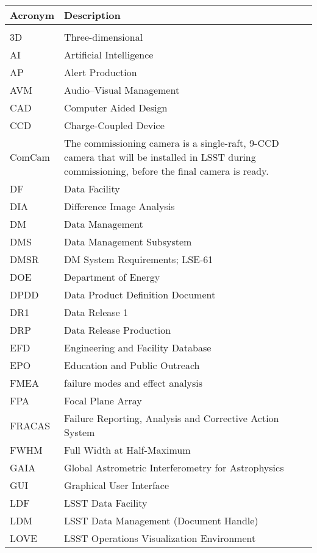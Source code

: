 \addtocounter{table}{-1}
\begin{longtable}{p{}p{}}\hline
\textbf{Acronym} & \textbf{Description}  \\\hline

 &  \\\hline
3D & Three-dimensional \\\hline
AI & Artificial Intelligence \\\hline
AP & Alert Production \\\hline
AVM & Audio--Visual Management \\\hline
CAD & Computer Aided Design \\\hline
CCD & Charge-Coupled Device \\\hline
ComCam & The commissioning camera is a single-raft, 9-CCD camera that will be installed in LSST during commissioning, before the final camera is ready. \\\hline
DF & Data Facility \\\hline
DIA & Difference Image Analysis \\\hline
DM & Data Management \\\hline
DMS & Data Management Subsystem \\\hline
DMSR & DM System Requirements; LSE-61 \\\hline
DOE & Department of Energy \\\hline
DPDD & Data Product Definition Document \\\hline
DR1 & Data Release 1 \\\hline
DRP & Data Release Production \\\hline
EFD & Engineering and Facility Database \\\hline
EPO & Education and Public Outreach \\\hline
FMEA & failure modes and effect analysis \\\hline
FPA & Focal Plane Array \\\hline
FRACAS & Failure Reporting, Analysis and Corrective Action System \\\hline
FWHM & Full Width at Half-Maximum \\\hline
GAIA & Global Astrometric Interferometry for Astrophysics \\\hline
GUI & Graphical User Interface \\\hline
LDF & LSST Data Facility \\\hline
LDM & LSST Data Management (Document Handle) \\\hline
LOVE & LSST Operations Visualization Environment \\\hline

\end{longtable}
